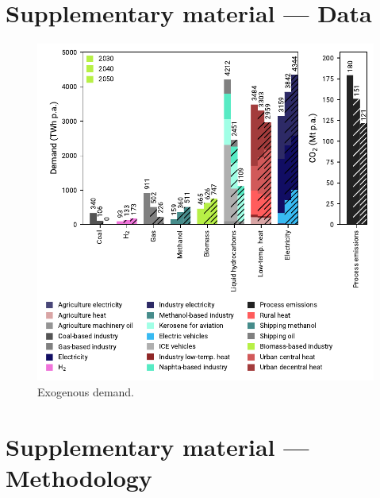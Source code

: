 \documentclass[preprint,12pt,sort&compress]{elsarticle}
\begin{document}
\section{Supplementary material --- Data}
\label{app:data}\begin{figure}[htbp]
  \centering
  \includegraphics[width=\textwidth]{exogenous_demand.pdf}
  \caption{Exogenous demand.}
  \label{fig:exogenous_demand}
\end{figure}

\clearpage
\section{Supplementary material --- Methodology}
\label{app:methodology}
\end{document}
